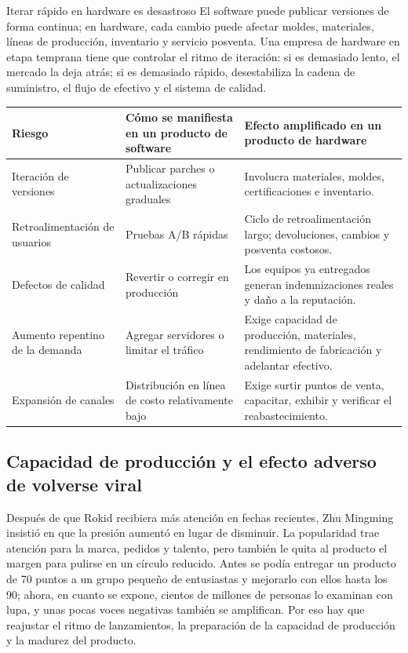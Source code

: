 \begin{warningbox}{Iterar rápido en hardware es desastroso}
El software puede publicar versiones de forma continua; en hardware, cada cambio puede afectar moldes, materiales, líneas de producción, inventario y servicio posventa. Una empresa de hardware en etapa temprana tiene que controlar el ritmo de iteración: si es demasiado lento, el mercado la deja atrás; si es demasiado rápido, desestabiliza la cadena de suministro, el flujo de efectivo y el sistema de calidad.
\end{warningbox}

\noindent\begin{tabularx}{\textwidth}{p{}p{}X}
\toprule
Riesgo & Cómo se manifiesta en un producto de software & Efecto amplificado en un producto de hardware \\
\midrule
Iteración de versiones & Publicar parches o actualizaciones graduales & Involucra materiales, moldes, certificaciones e inventario. \\
Retroalimentación de usuarios & Pruebas A/B rápidas & Ciclo de retroalimentación largo; devoluciones, cambios y posventa costosos. \\
Defectos de calidad & Revertir o corregir en producción & Los equipos ya entregados generan indemnizaciones reales y daño a la reputación. \\
Aumento repentino de la demanda & Agregar servidores o limitar el tráfico & Exige capacidad de producción, materiales, rendimiento de fabricación y adelantar efectivo. \\
Expansión de canales & Distribución en línea de costo relativamente bajo & Exige surtir puntos de venta, capacitar, exhibir y verificar el reabastecimiento. \\
\bottomrule
\end{tabularx}

\subsection{Capacidad de producción y el efecto adverso de volverse viral}

Después de que Rokid recibiera más atención en fechas recientes, Zhu Mingming insistió en que la presión aumentó en lugar de disminuir. La popularidad trae atención para la marca, pedidos y talento, pero también le quita al producto el margen para pulirse en un círculo reducido. Antes se podía entregar un producto de 70 puntos a un grupo pequeño de entusiastas y mejorarlo con ellos hasta los 90; ahora, en cuanto se expone, cientos de millones de personas lo examinan con lupa, y unas pocas voces negativas también se amplifican. Por eso hay que reajustar el ritmo de lanzamientos, la preparación de la capacidad de producción y la madurez del producto.

